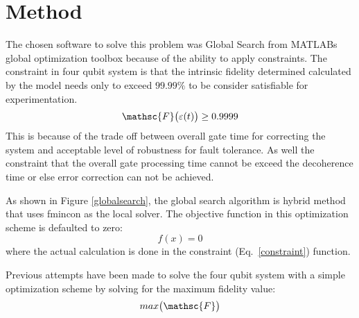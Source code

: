 \usepackage{mathrsfs}
\section{Method}

The chosen software to solve this problem was Global Search from MATLABs global optimization toolbox because of the ability to apply constraints. The constraint in four qubit system is that the intrinsic fidelity determined calculated by the model needs only to exceed $99.99\%$ to be consider satisfiable for experimentation.
\begin{equation}
  \mathsc{F}\big(\varepsilon(t)\big) \geq 0.9999
  \label{constraint}
\end{equation}
 This is because of the trade off between overall gate time for correcting the system and acceptable level of robustness for fault tolerance. As well
the constraint that the overall gate processing time cannot be exceed the decoherence time or else error correction can not be achieved. 

As shown in Figure \ref{globalsearch}, the global search algorithm is hybrid method that uses fmincon as the local solver. The objective function in this optimization scheme is defaulted to zero: 
\begin{equation}
  f(x) = 0
\end{equation}
where the actual calculation is done in the constraint (Eq.~\ref{constraint}) function. 

Previous attempts have been made to solve the four qubit system with a simple optimization scheme by solving for the maximum fidelity value:
\begin{equation}
  max \big(\mathsc{F}\big) 
\end{equation}


